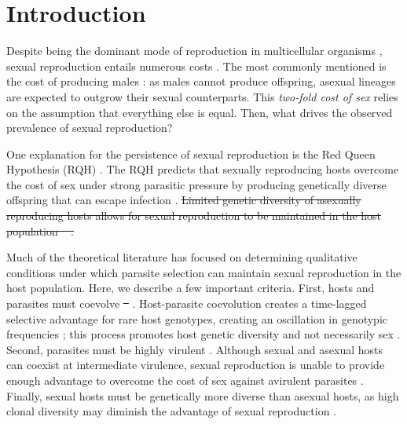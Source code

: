 \documentclass{article}\usepackage[]{graphicx}\usepackage[]{color}
\providecommand{\DIFaddtex}[1]{{\protect\color{blue}\uwave{#1}}} %
\providecommand{\DIFdeltex}[1]{{\protect\color{red}\sout{#1}}}                      %
\providecommand{\DIFaddbegin}{} %
\providecommand{\DIFaddend}{} %
\providecommand{\DIFdelbegin}{} %
\providecommand{\DIFdelend}{} %
\providecommand{\DIFadd}[1]{\texorpdfstring{\DIFaddtex{#1}}{#1}} %
\providecommand{\DIFdel}[1]{\texorpdfstring{\DIFdeltex{#1}}{}} %
\newcommand{\DIFscaledelfig}{0.5}
\newlength{\DIFdelgraphicswidth} %
\newlength{\DIFdelgraphicsheight} %
\newcommand{\DIFaddincludegraphics}[2][]{{\color{blue}\fbox{\DIFOincludegraphics[#1]{#2}}}} %
\newcommand{\DIFdelincludegraphics}[2][]{%
\sbox{\DIFdelgraphicsbox}{\DIFOincludegraphics[#1]{#2}}%
\settoboxwidth{\DIFdelgraphicswidth}{\DIFdelgraphicsbox} %
\settoboxtotalheight{\DIFdelgraphicsheight}{\DIFdelgraphicsbox} %
\scalebox{\DIFscaledelfig}{%
\parbox[b]{\DIFdelgraphicswidth}{\usebox{\DIFdelgraphicsbox}\\[-\baselineskip] \rule{\DIFdelgraphicswidth}{0em}}\llap{\resizebox{\DIFdelgraphicswidth}{\DIFdelgraphicsheight}{%
\setlength{\unitlength}{\DIFdelgraphicswidth}%
\begin{picture}(1,1)%
\thicklines\linethickness{2pt} %
{\color[rgb]{1,0,0}\put(0,0){\framebox(1,1){}}}%
{\color[rgb]{1,0,0}\put(0,0){\line( 1,1){1}}}%
{\color[rgb]{1,0,0}\put(0,1){\line(1,-1){1}}}%
\end{picture}%
}\hspace*{3pt}}} %
} %
\DeclareRobustCommand{\DIFaddbegin}{\DIFOaddbegin \let\includegraphics\DIFaddincludegraphics} %
\DeclareRobustCommand{\DIFaddend}{\DIFOaddend \let\includegraphics\DIFOincludegraphics} %
\DeclareRobustCommand{\DIFdelbegin}{\DIFOdelbegin \let\includegraphics\DIFdelincludegraphics} %
\DeclareRobustCommand{\DIFdelend}{\DIFOaddend \let\includegraphics\DIFOincludegraphics} %
\begin{document}
\section{Introduction}

Despite being the dominant mode of reproduction in multicellular organisms \citep{vrijenhoek1998animal, whitton2008dynamic, otto2009evolutionary}, sexual reproduction entails numerous costs \citep{lehtonen2012many}.
The most commonly mentioned is the cost of producing males \citep{smith1978evolution}:
as males cannot produce offspring, asexual lineages are expected to outgrow their sexual counterparts.
This \emph{two-fold cost of sex} \citep{smith1978evolution} relies on the assumption that everything else is equal.
Then, what drives the observed prevalence of sexual reproduction?
\DIFdelbegin %

\DIFdelend One explanation for the persistence of sexual reproduction is the Red Queen Hypothesis (RQH) \citep{bell1982masterpiece}.
The RQH predicts that sexually reproducing hosts overcome the cost of sex under strong parasitic pressure by producing genetically diverse offspring that can escape infection \citep{jbs1949disease, jaenike1978hypothesis, hamilton1980sex, hamilton1990sexual}.
\DIFdelbegin \DIFdel{Limited genetic diversity of asexually reproducing hosts allows for sexual reproduction to be maintained in the host population \mbox{%
\citep{ashby2015diversity}}\hspace{0pt}%
.
}\DIFdelend %

Much of the theoretical literature has focused on determining qualitative conditions under which parasite selection can maintain sexual reproduction in the host population.
Here, we describe a few important criteria.
First, hosts and parasites must coevolve \DIFdelbegin \DIFdel{\mbox{%
\citep{bell1982masterpiece}}\hspace{0pt}%
}\DIFdelend \DIFaddbegin \DIFadd{\mbox{%
\citep{bell1982masterpiece, paterson2010antagonistic}}\hspace{0pt}%
}\DIFaddend .
Host-parasite coevolution creates a time-lagged selective advantage for rare host genotypes, creating an oscillation in genotypic frequencies \citep{jaenike1978hypothesis, hamilton1980sex, agrawal2001parasites}; this process promotes host genetic diversity and not necessarily sex \citep{king2009geographic, dagan2013clonal, ashby2015diversity}.
Second, parasites must be highly virulent \citep{may1983epidemiology}.
Although sexual and asexual hosts can coexist at intermediate virulence, sexual reproduction is unable to provide enough advantage to overcome the cost of sex against avirulent parasites \citep{howard1994parasitism}.
Finally, sexual hosts must be genetically more diverse than asexual hosts, as high clonal diversity may diminish the advantage of sexual reproduction \citep{lively1994selection, lively2010review, ashby2015diversity}.
\end{document}
